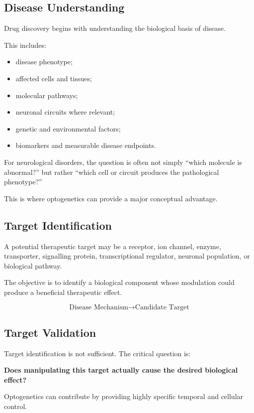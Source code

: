 \documentclass[11pt]{article}
\begin{document}
\subsection{Disease Understanding}

Drug discovery begins with understanding the biological basis of disease.

This includes:
\begin{itemize}[nosep]
\item disease phenotype;
\item affected cells and tissues;
\item molecular pathways;
\item neuronal circuits where relevant;
\item genetic and environmental factors;
\item biomarkers and measurable disease endpoints.
\end{itemize}

For neurological disorders, the question is often not simply
``which molecule is abnormal?'' but rather
``which cell or circuit produces the pathological phenotype?''

This is where optogenetics can provide a major conceptual advantage.

\subsection{Target Identification}

A potential therapeutic target may be a receptor, ion channel,
enzyme, transporter, signalling protein, transcriptional
regulator, neuronal population, or biological pathway.

The objective is to identify a biological component whose
modulation could produce a beneficial therapeutic effect.

\[
\boxed{\text{Disease Mechanism} \rightarrow \text{Candidate Target}}
\]

\subsection{Target Validation}

Target identification is not sufficient. The critical question is:

\begin{center}
\textbf{Does manipulating this target actually cause the desired biological effect?}
\end{center}

Optogenetics can contribute by providing highly specific
temporal and cellular control.
\end{document}
